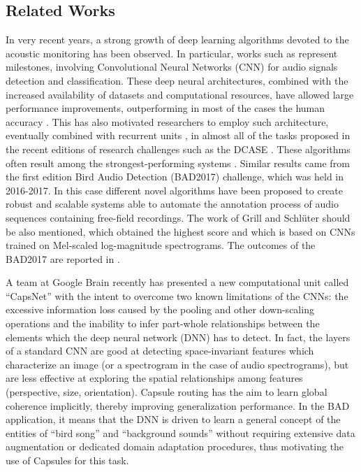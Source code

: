 \subsection{Related Works}

In very recent years, a strong growth of deep learning algorithms devoted to the acoustic monitoring has been observed. In particular, works such as \cite{mcloughlin2015low, piczak2015environmental, salamon2017deep} represent milestones, involving Convolutional Neural Networks (CNN) for audio signals detection and classification.
These deep neural architectures, combined with the increased availability of datasets and computational resources, have allowed large performance improvements, outperforming in most of the cases the human accuracy \cite{sailor2017unsupervised}. This has also motivated researchers to employ such architecture, eventually combined with recurrent units \cite{cakir2017convolutional}, in almost all of the tasks proposed in the recent editions of research challenges such as the DCASE \cite{DCASE2017challenge}. These algorithms often result among the strongest-performing systems \cite{limrare, valenti2017convolutional}.
Similar results came from the first edition Bird Audio Detection (BAD2017) challenge, which was held in 2016-2017. In this case different novel algorithms have been proposed to create robust and scalable systems able to automate the annotation process of audio sequences containing free-field recordings. The work of Grill and Schl\"{u}ter \cite{grill2017two} should be also mentioned, which obtained the highest score and which is based on CNNs trained on Mel-scaled log-magnitude spectrograms. The outcomes of the BAD2017 are reported in \cite{stowell2018automatic}.

A team at Google Brain recently has presented a new computational unit \cite{sabour2017dynamic} called ``CapsNet'' with the intent to overcome two known limitations of the CNNs: the excessive information loss caused by the pooling and other down-scaling operations and the inability to infer part-whole relationships between the elements which the deep neural network (DNN) has to detect. In fact, the layers of a standard CNN are good at detecting space-invariant features which characterize an image (or a spectrogram in the case of audio spectrograms), but are less effective at exploring the spatial relationships among features (perspective, size, orientation). Capsule routing has the aim to learn global coherence implicitly, thereby improving generalization performance. In the BAD application, it means that the DNN is driven to learn a general concept of the entities of ``bird song'' and ``background sounds'' without requiring extensive data augmentation or dedicated domain adaptation procedures, thus motivating the use of Capsules for this task. 

